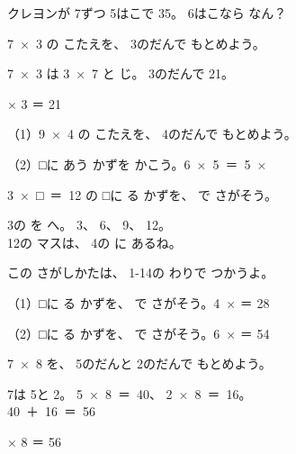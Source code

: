 \begin{jibun}
クレヨンが 7ずつ 5はこで 35。 6はこなら なん？
\bkshikiran
{}
\end{jibun}

\begin{reidai}
\mbox{7 × 3} の こたえを、 3のだんで もとめよう。

\kangaekata \mbox{7 × 3} は \mbox{3 × 7} と じ。 3のだんで 21。

 × 3 ＝ 21 
\end{reidai}

\begin{jibun}
（1）\mbox{9 × 4} の こたえを、 4のだんで もとめよう。\hfill\bkkakikomi\par\vspace{2pt}
（2）□に あう かずを かこう。\hspace{2\zw}\mbox{6 × 5 ＝ 5 ×} \bkkakikomi
{}
\end{jibun}

\begin{reidai}
\mbox{3 × □ ＝ 12} の □に る かずを、 で さがそう。

\kangaekata 3の を へ。 3、 6、 9、 12。\\ 12の マスは、 4の に あるね。

\par
{\small\color{bkBlue!80!black}この さがしかたは、 1-14の わりで つかうよ。}
\end{reidai}

\begin{jibun}
（1）□に る かずを、 で さがそう。\hfill \mbox{4 ×} \bkkakikomi\enspace ＝ 28\par\vspace{2pt}
（2）□に る かずを、 で さがそう。\hfill \mbox{6 ×} \bkkakikomi\enspace ＝ 54
\end{jibun}

\begin{reidai}
\mbox{7 × 8} を、 5のだんと 2のだんで もとめよう。

\kangaekata 7は 5と 2。 \mbox{5 × 8 ＝ 40}、 \mbox{2 × 8 ＝ 16}。\\
\bkqlkindent\mbox{40 ＋ 16 ＝ 56}

 × 8 ＝ 56 
\end{reidai}

